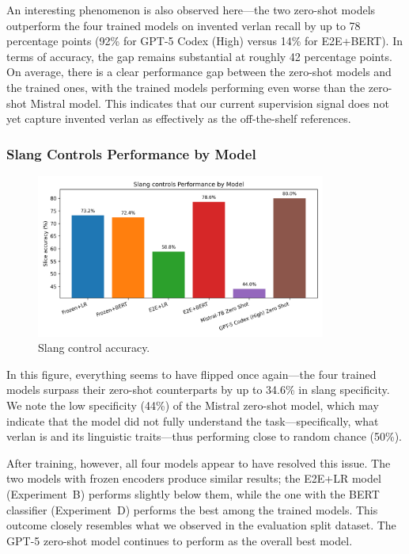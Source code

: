 \documentclass[12pt]{article}
\begin{document}
An interesting phenomenon is also observed here\;---\;the two zero-shot models outperform the four trained models on invented verlan recall by up to 78 percentage points (92\% for GPT-5 Codex (High) versus 14\% for E2E+BERT). 
In terms of accuracy, the gap remains substantial at roughly 42 percentage points.
On average, there is a clear performance gap between the zero-shot models and the trained ones, with the trained models performing even worse than the zero-shot Mistral model. This indicates that our current supervision signal does not yet capture invented verlan as effectively as the off-the-shelf references.

\subsubsection{Slang Controls Performance by Model}

\begin{figure}[htbp]
    \centering
    \includegraphics[width=0.85\textwidth]{figures/slang_controls_comparison.png}
    \caption{Slang control accuracy.}
    \label{fig:slang-comparison}
\end{figure}

In this figure, everything seems to have flipped once again\;---\;the four trained models surpass their zero-shot counterparts by up to 34.6\% in slang specificity. 
We note the low specificity (44\%) of the Mistral zero-shot model, which may indicate that the model did not fully understand the task\;---\;specifically, what verlan is and its linguistic traits\;---\;thus performing close to random chance (50\%).

After training, however, all four models appear to have resolved this issue. 
The two models with frozen encoders produce similar results; the E2E+LR model (Experiment~B) performs slightly below them, while the one with the BERT classifier (Experiment~D) performs the best among the trained models. 
This outcome closely resembles what we observed in the evaluation split dataset. 
The GPT-5 zero-shot model continues to perform as the overall best model.
\end{document}
